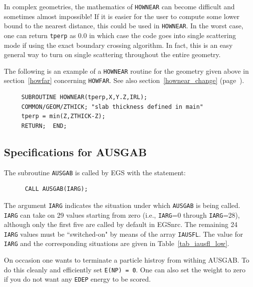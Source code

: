 In complex geometries, the mathematics of {\tt HOWNEAR} can become difficult and
sometimes almost impossible!  If it is easier for the user to compute
some lower bound to the nearest distance, this could be
used in {\tt HOWNEAR}.  In the worst case, one can return \verb+tperp+ as 0.0
in which case the code goes into single scattering mode if using the
exact boundary crossing algorithm.  In fact, this is an easy general way to
turn on single scattering throughout the entire geometry.

The following is an example of a {\tt HOWNEAR} routine for the geometry given
above in section~\ref{howfar} concerning {\tt HOWFAR}.
See also section~\ref{hownear_change} (page~\pageref{hownear_change}).
\begin{verbatim}
     SUBROUTINE HOWNEAR(tperp,X,Y.Z,IRL);
     COMMON/GEOM/ZTHICK; "slab thickness defined in main"
     tperp = min(Z,ZTHICK-Z);
     RETURN;  END;
\end{verbatim}



\subsection{Specifications for AUSGAB}
\label{ausgab}

The subroutine {\tt AUSGAB} is called by EGS with the statement:
\begin{verbatim}
      CALL AUSGAB(IARG);
\end{verbatim}
The argument {\tt IARG} indicates the situation under which {\tt AUSGAB}
is being called.  {\tt IARG} can take on 29 values starting from zero
(i.e., {\tt IARG}=0 through {\tt IARG}=28), although only the first
five are called by default in EGSnrc.  The remaining 24 {\tt IARG}
values must be ``switched-on" by means of the array {\tt IAUSFL}.
The value for {\tt IARG} and the corresponding situations are given in
Table~\ref{tab_iausfl_low}.

On occasion one wants to terminate a particle histroy from withing AUSGAB.
To do this cleanly and efficiently set {\tt E(NP) = 0}. One can also set
the weight to zero if you do not want any {\tt EDEP} energy to be scored.

